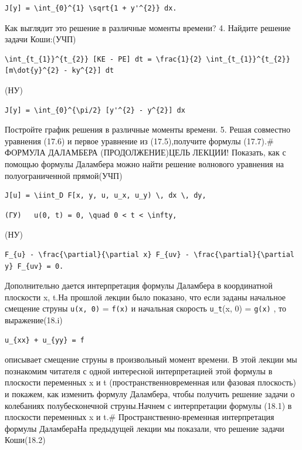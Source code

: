 \documentclass[
  ukrainian,
]{article}
\begin{document}
\begin{verbatim}
J[y] = \int_{0}^{1} \sqrt{1 + y'^{2}} dx.
\end{verbatim}

Как выглядит это решение в различные моменты времени? 4. Найдите решение
задачи Коши:(УЧП)

\begin{verbatim}
\int_{t_{1}}^{t_{2}} [KE - PE] dt = \frac{1}{2} \int_{t_{1}}^{t_{2}} [m\dot{y}^{2} - ky^{2}] dt
\end{verbatim}

(НУ)

\begin{verbatim}
J[y] = \int_{0}^{\pi/2} [y'^{2} - y^{2}] dx
\end{verbatim}

Постройте график решения в различные моменты времени. 5. Решая совместно
уравнения (17.6) и первое уравнение из (17.5),получите формулы (17.7).\#
ФОРМУЛА ДАЛАМБЕРА (ПРОДОЛЖЕНИЕ)ЦЕЛЬ ЛЕКЦИИ! Показать, как с помощью
формулы Даламбера можно найти решение волнового уравнения на
полуограниченной прямой(УЧП)

\begin{verbatim}
J[u] = \iint_D F[x, y, u, u_x, u_y) \, dx \, dy,
\end{verbatim}

\begin{verbatim}
(ГУ)   u(0, t) = 0, \quad 0 < t < \infty,
\end{verbatim}

(НУ)

\begin{verbatim}
F_{u} - \frac{\partial}{\partial x} F_{uv} - \frac{\partial}{\partial y} F_{uv} = 0.
\end{verbatim}

Дополнительно дается интерпретация формулы Даламбера в координатной
плоскости x, t.На прошлой лекции было показано, что если заданы
начальное смещение струны \texttt{u(x,\ 0)} = \texttt{f(x)} и начальная
скорость \texttt{u\_t}(x, 0) = \texttt{g(x)} , то выражение(18.i)

\begin{verbatim}
u_{xx} + u_{yy} = f
\end{verbatim}

описывает смещение струны в произвольный момент времени. В этой лекции
мы познакомим читателя с одной интересной интерпретацией этой формулы в
плоскости переменных x и t (пространственновременная или фазовая
плоскость) и покажем, как изменить формулу Даламбера, чтобы получить
решение задачи о колебаниях полубесконечной струны.Начнем с
интерпретации формулы (18.1) в плоскости переменных x и t.\#
Пространственно-временная интерпретация формулы ДаламбераНа предыдущей
лекции мы показали, что решение задачи Коши(18.2)
\end{document}
